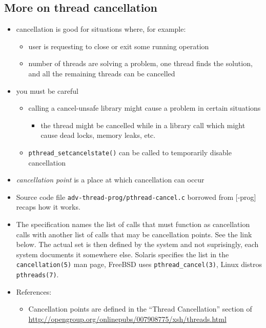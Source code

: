 \subsection{More on thread cancellation}

\begin{itemize}
\item cancellation is good for situations where, for example:
	\begin{itemize}
	\item user is requesting to close or exit some running operation
	\item number of threads are solving a problem, one thread finds the
	solution, and all the remaining threads can be cancelled
	\end{itemize}
\item you must be careful
	\begin{itemize}
	\item calling a cancel-unsafe library might cause a problem in certain
	situations
	\begin{itemize}
		\item the thread might be cancelled while in a library call
		which might cause dead locks, memory leaks, etc.
		\end{itemize}
	\item \texttt{pthread\_setcancelstate()} can be called to temporarily
	disable cancellation
	\end{itemize}
\item \emph{cancellation point} is a place at which cancellation can occur
\end{itemize}


\begin{itemize}
\item Source code file \texttt{adv-thread-prog/pthread-cancel.c} borrowed from
[\myun\myix-prog] recaps how it works.
\item The specification names the list of calls that must function as
cancellation calls with another list of calls that may be cancellation points.
See the link below. The actual set is then defined by the system and not
suprisingly, each system documents it somewhere else. Solaris specifies the list
in the \texttt{cancellation(5)} man page, FreeBSD uses
\texttt{pthread\_cancel(3)}, Linux distros \texttt{pthreads(7)}.
\item References:
	\begin{itemize}
	\item Cancellation points are defined in the ``Thread Cancellation''
	section of
	\url{http://opengroup.org/onlinepubs/007908775/xsh/threads.html}
	\end{itemize}
\end{itemize}

